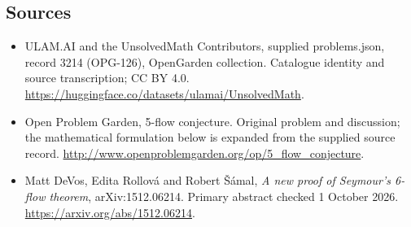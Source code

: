 \documentclass[11pt,a4paper]{article}
\begin{document}
\subsection{Sources}
\begin{itemize}
\item[S1] ULAM.AI and the UnsolvedMath Contributors, supplied problems.json, record 3214 (OPG-126), OpenGarden collection. Catalogue identity and source transcription; CC BY 4.0.
\url{https://huggingface.co/datasets/ulamai/UnsolvedMath}.
\item[S2] Open Problem Garden, 5-flow conjecture. Original problem and discussion; the mathematical formulation below is expanded from the supplied source record.
\url{http://www.openproblemgarden.org/op/5_flow_conjecture}.
\item[R1] Matt DeVos, Edita Rollová and Robert Šámal,
\emph{A new proof of Seymour's 6-flow theorem}, arXiv:1512.06214.
Primary abstract checked 1 October 2026.
\url{https://arxiv.org/abs/1512.06214}.
\end{itemize}
\end{document}
